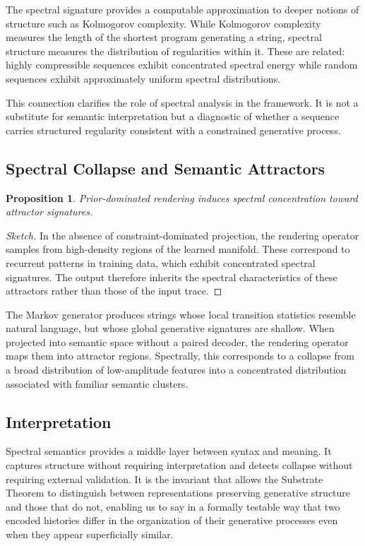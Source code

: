 \documentclass[12pt, a4paper]{article}
\theoremstyle{plain}
\newtheorem{proposition}[theorem]{Proposition}
\theoremstyle{definition}
\theoremstyle{remark}
\begin{document}
The spectral signature provides a computable approximation to deeper notions of structure such as Kolmogorov complexity. While Kolmogorov complexity measures the length of the shortest program generating a string, spectral structure measures the distribution of regularities within it. These are related: highly compressible sequences exhibit concentrated spectral energy while random sequences exhibit approximately uniform spectral distributions.

This connection clarifies the role of spectral analysis in the framework. It is not a substitute for semantic interpretation but a diagnostic of whether a sequence carries structured regularity consistent with a constrained generative process.

\subsection{Spectral Collapse and Semantic Attractors}

\begin{proposition}
Prior-dominated rendering induces spectral concentration toward attractor signatures.
\end{proposition}

\begin{proof}[Sketch]
In the absence of constraint-dominated projection, the rendering operator samples from high-density regions of the learned manifold. These correspond to recurrent patterns in training data, which exhibit concentrated spectral signatures. The output therefore inherits the spectral characteristics of these attractors rather than those of the input trace.
\end{proof}

The Markov generator produces strings whose local transition statistics resemble natural language, but whose global generative signatures are shallow. When projected into semantic space without a paired decoder, the rendering operator maps them into attractor regions. Spectrally, this corresponds to a collapse from a broad distribution of low-amplitude features into a concentrated distribution associated with familiar semantic clusters.

\subsection{Interpretation}

Spectral semantics provides a middle layer between syntax and meaning. It captures structure without requiring interpretation and detects collapse without requiring external validation. It is the invariant that allows the Substrate Theorem to distinguish between representations preserving generative structure and those that do not, enabling us to say in a formally testable way that two encoded histories differ in the organization of their generative processes even when they appear superficially similar.
\end{document}
